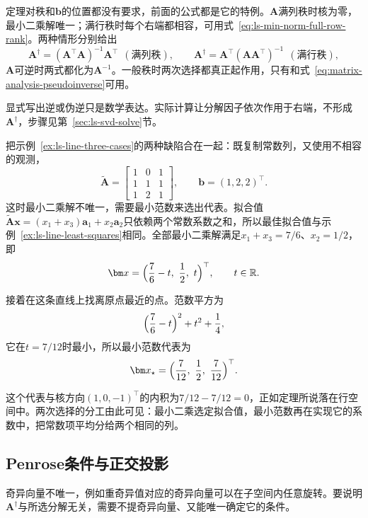 定理对秩和$\bm b$的位置都没有要求，前面的公式都是它的特例。$\bm A$满列秩时核为零，最小二乘解唯一；满行秩时每个右端都相容，可用式~\eqref{eq:ls-min-norm-full-row-rank}。两种情形分别给出
\[
 \bm A^\dagger=(\bm A^\top\bm A)^{-1}\bm A^\top\ \ (\text{满列秩}),\qquad
 \bm A^\dagger=\bm A^\top(\bm A\bm A^\top)^{-1}\ \ (\text{满行秩}),
\]
$\bm A$可逆时两式都化为$\bm A^{-1}$。一般秩时两次选择都真正起作用，只有和式~\eqref{eq:matrix-analysis-pseudoinverse}可用。

显式写出逆或伪逆只是数学表达。实际计算让分解因子依次作用于右端，不形成$\bm A^\dagger$，步骤见第~\ref{sec:ls-svd-solve}节。

\begin{example}[复制常数列后的最小范数拟合]
\label{ex:ls-line-min-norm}
把示例~\ref{ex:ls-line-three-cases}的两种缺陷合在一起：既复制常数列，又使用不相容的观测，
\[
 \widetilde{\bm A}=\begin{bmatrix}1&0&1\\1&1&1\\1&2&1\end{bmatrix},\qquad \bm b=(1,2,2)^\top .
\]
这时最小二乘解不唯一，需要最小范数来选出代表。拟合值$\widetilde{\bm A}\bm x=(x_1+x_3)\bm a_1+x_2\bm a_2$只依赖两个常数系数之和，所以最佳拟合值与示例~\ref{ex:ls-line-least-squares}相同。全部最小二乘解满足$x_1+x_3=7/6$、$x_2=1/2$，即
\[
 \bm x=\Bigl(\frac76-t,\ \frac12,\ t\Bigr)^\top,\qquad t\in\mathbb R .
\]

接着在这条直线上找离原点最近的点。范数平方为
\[
 \Bigl(\frac76-t\Bigr)^2+t^2+\frac14 ,
\]
它在$t=7/12$时最小，所以最小范数代表为
\[
 \bm x_\star=\Bigl(\frac7{12},\ \frac12,\ \frac7{12}\Bigr)^\top .
\]

这个代表与核方向$(1,0,-1)^\top$的内积为$7/12-7/12=0$，正如定理所说落在行空间中。两次选择的分工由此可见：最小二乘选定拟合值，最小范数再在实现它的系数中，把常数项平均分给两个相同的列。
\end{example}

\subsection{Penrose条件与正交投影}
\label{sec:ls-penrose-conditions}

奇异向量不唯一，例如重奇异值对应的奇异向量可以在子空间内任意旋转。要说明$\bm A^\dagger$与所选分解无关，需要不提奇异向量、又能唯一确定它的条件。


